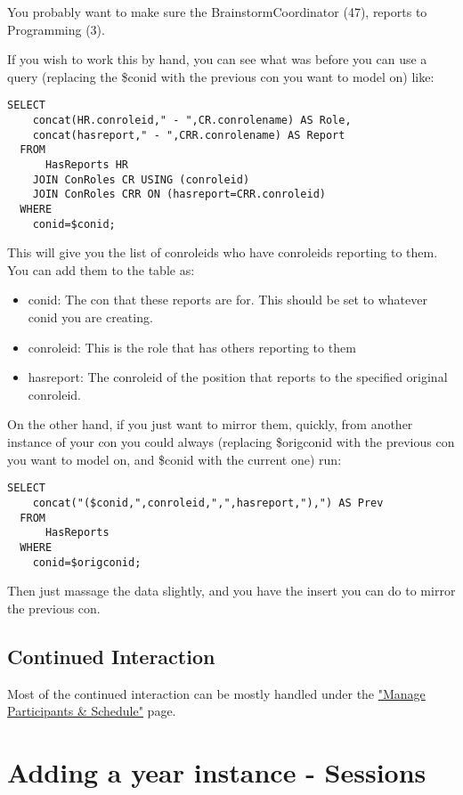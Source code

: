 \documentclass[captions=tablesignature]{scrartcl}
\begin{document}
You probably want to make sure the BrainstormCoordinator (47),
reports to Programming (3).

If you wish to work this by hand, you can see what was before you
can use a query (replacing the \$conid with the previous con you
want to model on) like:
\begin{verbatim}
SELECT
    concat(HR.conroleid," - ",CR.conrolename) AS Role,
    concat(hasreport," - ",CRR.conrolename) AS Report
  FROM
      HasReports HR
    JOIN ConRoles CR USING (conroleid)
    JOIN ConRoles CRR ON (hasreport=CRR.conroleid)
  WHERE
    conid=$conid;
\end{verbatim}
This will give you the list of conroleids who have conroleids
reporting to them.  You can add them to the table as:
\begin{itemize}
\item conid: The con that these reports are for.  This should be set
to whatever conid you are creating.
\item conroleid: This is the role that has others reporting to them
\item hasreport: The conroleid of the position that reports to the
specified original conroleid.
\end{itemize}

On the other hand, if you just want to mirror them, quickly, from
another instance of your con you could always (replacing \$origconid
with the previous con you want to model on, and \$conid with the
current one) run:
\begin{verbatim}
SELECT
    concat("($conid,",conroleid,",",hasreport,"),") AS Prev
  FROM
      HasReports
  WHERE
    conid=$origconid;
\end{verbatim}
Then just massage the data slightly, and you have the insert you
can do to mirror the previous con.

\subsection{Continued Interaction}
\label{sec-12-4}

Most of the continued interaction can be mostly handled under the
\href{../webpages/StaffManageParticipants.php}{"Manage Participants \& Schedule"} page.

\section{Adding a year instance - Sessions}
\label{sec-13}
\end{document}
